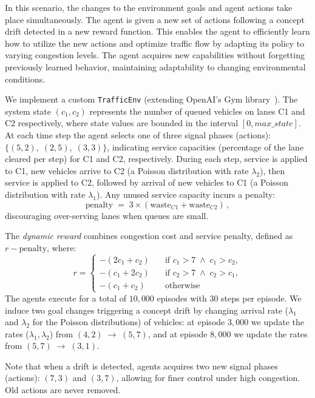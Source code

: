 In this scenario, the changes to the environment goals and agent actions take place simultaneously. 
The agent is given a new set of actions following a concept drift detected in a new reward function. 
This enables the agent to efficiently learn how to utilize the new actions and optimize traffic flow by 
adapting its policy to varying congestion levels. The agent acquires new capabilities without forgetting 
previously learned behavior, maintaining adaptability to changing environmental conditions.

We implement a custom \texttt{TrafficEnv} (extending OpenAI's Gym library~\cite{gymlib}). The system 
state $(c_1,c_2)$ represents the number of queued vehicles on lanes C1 and C2 respectively, where 
state values are bounded in the interval $[0,\mathit{max\_state}]$. At each time step the agent selects 
one of three signal phases (actions): $\{(5,2),\;(2,5),\;(3,3)\}$, indicating service capacities (percentage 
of the lane cleared per step) for C1 and C2, respectively. During each step, service is applied to C1, 
new vehicles arrive to C2 (a Poisson distribution with rate $\lambda_{2}$), then service is applied to 
C2, followed by arrival of new vehicles to C1 (a Poisson distribution with rate $\lambda_{1}$). Any 
unused service capacity incurs a penalty:
\[
\mathrm{penalty} \;=\; 3\times(\text{waste}_{C1} + \text{waste}_{C2})\,,
\]
discouraging over-serving lanes when queues are small.

The \emph{dynamic reward} combines congestion cost and service penalty, defined as 
$r - \mathrm{penalty}$, where:
\[
r = 
\begin{cases}
-(2c_1 + c_2)\quad &\text{if }c_1>7 \;\wedge\;c_1>c_2,\\
-(c_1 + 2c_2)\quad &\text{if }c_2>7 \;\wedge\;c_2>c_1,\\
-(c_1 + c_2)\quad &\text{otherwise}
\end{cases}
\]
The agents  execute for a total of $10,000$ episodes with 30 steps per episode. We induce two 
goal changes triggering a concept drift by changing arrival rate ($\lambda_1$ and $\lambda_2$ for 
the Poisson distributions) of vehicles: at episode $3,000$ we update the rates 
($\lambda_1, \lambda_2$) from $(4,2)\;\to\;(5,7)$, and at episode $8,000$ we update the rates from $(5,7)\;\to\;(3,1)$.


Note that when a drift is detected, agents acquires two new signal phases (\ie actions):
$(7,3)$ and $(3,7)$, allowing for finer control under high congestion. Old actions are never removed.

